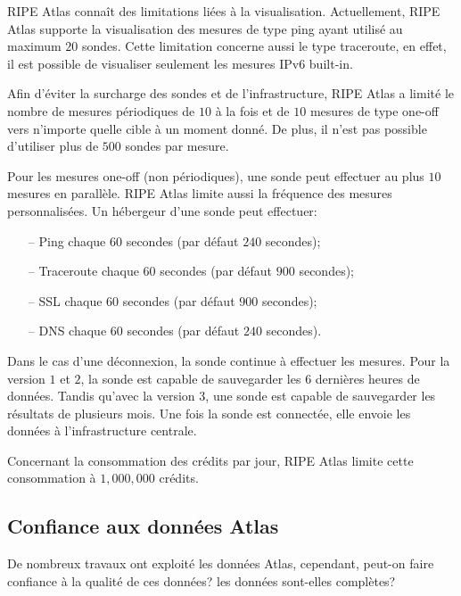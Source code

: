 RIPE Atlas connaît des limitations  liées à la visualisation. Actuellement, RIPE Atlas supporte la visualisation des mesures de type ping ayant utilisé au maximum $20$  sondes. Cette limitation concerne aussi le type traceroute, en effet,  il est possible de visualiser seulement les mesures IPv6 built-in.

Afin d'éviter la surcharge  des sondes et de l'infrastructure, RIPE Atlas a limité le nombre de mesures périodiques de $10$ à la fois et de $10$ mesures de type one-off vers n'importe quelle cible à un moment donné. De plus, il n'est pas possible d'utiliser  plus de $500$ sondes par mesure.

Pour les mesures one-off (non périodiques), une sonde peut effectuer au plus $10$ mesures en parallèle. RIPE Atlas limite aussi la fréquence des mesures personnalisées. Un hébergeur d'une sonde peut effectuer:

\begin{itemize}
	\item[--] Ping chaque $60$ secondes (par défaut  $240$ secondes);
	\item[--] Traceroute chaque $60$ secondes (par défaut  $900$ secondes);
	\item[--] SSL chaque $60$ secondes (par défaut  $900$ secondes);
	\item[--] DNS chaque $60$ secondes (par défaut $240$ secondes).
	
\end{itemize}

Dans le cas d'une déconnexion, la sonde continue à effectuer les mesures. Pour la version $1$ et $2$, la sonde est capable de sauvegarder les  $6$ dernières heures de données. Tandis qu'avec  la  version $3$, une sonde est capable de sauvegarder les résultats de plusieurs mois. Une fois la sonde est connectée, elle envoie les  données à l'infrastructure centrale.

Concernant la consommation des crédits par jour, RIPE Atlas limite cette consommation à  $1,000,000$ crédits.


\subsection{Confiance aux données Atlas}

De nombreux travaux ont exploité les données Atlas, cependant, peut-on faire confiance à la qualité de ces données? les données sont-elles complètes?


